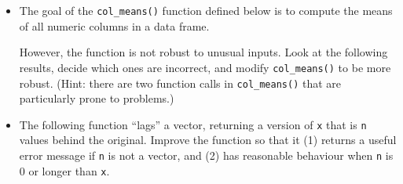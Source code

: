 \begin{itemize}
\item
  The goal of the \texttt{col\_means()} function defined below is to
  compute the means of all numeric columns in a data frame.

\begin{Shaded}
\begin{Highlighting}[]
\StringTok{ }
  \StringTok{ }
  \StringTok{ }

  \NormalTok{(}
\NormalTok{\}}
\end{Highlighting}
\end{Shaded}

  However, the function is not robust to unusual inputs. Look at the
  following results, decide which ones are incorrect, and modify
  \texttt{col\_means()} to be more robust. (Hint: there are two function
  calls in \texttt{col\_means()} that are particularly prone to
  problems.)

\begin{Shaded}
\begin{Highlighting}[]
\NormalTok{(mtcars[, }\NormalTok{])}
\NormalTok{(mtcars[}\NormalTok{, ])}
\NormalTok{(mtcars[, }\NormalTok{, } \NormalTok{F])}
\NormalTok{(}\NormalTok{:}\NormalTok{)}
\NormalTok{(}
\NormalTok{(}

\StringTok{ }
\NormalTok{mtcars2[-}\NormalTok{] <-}\StringTok{ }\NormalTok{(mtcars2[-}\NormalTok{], as.character)}
\end{Highlighting}
\end{Shaded}
\item
  The following function ``lags'' a vector, returning a version of
  \texttt{x} that is \texttt{n} values behind the original. Improve the
  function so that it (1) returns a useful error message if \texttt{n}
  is not a vector, and (2) has reasonable behaviour when \texttt{n} is 0
  or longer than \texttt{x}.

\begin{Shaded}
\begin{Highlighting}[]
\StringTok{ } 
  \StringTok{ }
  \NormalTok{(}\NormalTok{(}\NormalTok{, n), x[}\StringTok{ }\NormalTok{n)])}
\NormalTok{\}}
\end{Highlighting}
\end{Shaded}
\end{itemize}

